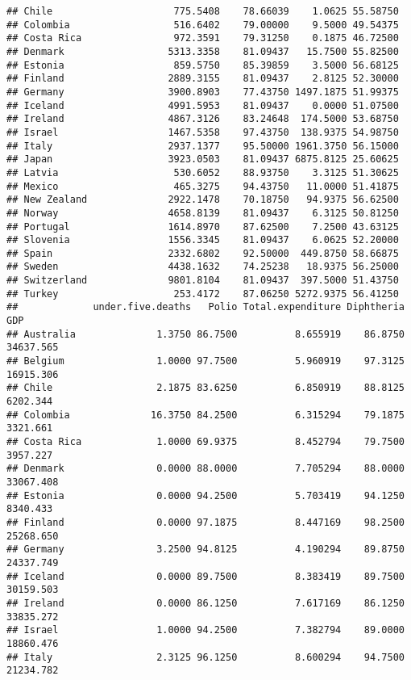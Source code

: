 \documentclass[
]{article}
\begin{document}
\begin{verbatim}
## Chile                     775.5408    78.66039    1.0625 55.58750
## Colombia                  516.6402    79.00000    9.5000 49.54375
## Costa Rica                972.3591    79.31250    0.1875 46.72500
## Denmark                  5313.3358    81.09437   15.7500 55.82500
## Estonia                   859.5750    85.39859    3.5000 56.68125
## Finland                  2889.3155    81.09437    2.8125 52.30000
## Germany                  3900.8903    77.43750 1497.1875 51.99375
## Iceland                  4991.5953    81.09437    0.0000 51.07500
## Ireland                  4867.3126    83.24648  174.5000 53.68750
## Israel                   1467.5358    97.43750  138.9375 54.98750
## Italy                    2937.1377    95.50000 1961.3750 56.15000
## Japan                    3923.0503    81.09437 6875.8125 25.60625
## Latvia                    530.6052    88.93750    3.3125 51.30625
## Mexico                    465.3275    94.43750   11.0000 51.41875
## New Zealand              2922.1478    70.18750   94.9375 56.62500
## Norway                   4658.8139    81.09437    6.3125 50.81250
## Portugal                 1614.8970    87.62500    7.2500 43.63125
## Slovenia                 1556.3345    81.09437    6.0625 52.20000
## Spain                    2332.6802    92.50000  449.8750 58.66875
## Sweden                   4438.1632    74.25238   18.9375 56.25000
## Switzerland              9801.8104    81.09437  397.5000 51.43750
## Turkey                    253.4172    87.06250 5272.9375 56.41250
##             under.five.deaths   Polio Total.expenditure Diphtheria       GDP
## Australia              1.3750 86.7500          8.655919    86.8750 34637.565
## Belgium                1.0000 97.7500          5.960919    97.3125 16915.306
## Chile                  2.1875 83.6250          6.850919    88.8125  6202.344
## Colombia              16.3750 84.2500          6.315294    79.1875  3321.661
## Costa Rica             1.0000 69.9375          8.452794    79.7500  3957.227
## Denmark                0.0000 88.0000          7.705294    88.0000 33067.408
## Estonia                0.0000 94.2500          5.703419    94.1250  8340.433
## Finland                0.0000 97.1875          8.447169    98.2500 25268.650
## Germany                3.2500 94.8125          4.190294    89.8750 24337.749
## Iceland                0.0000 89.7500          8.383419    89.7500 30159.503
## Ireland                0.0000 86.1250          7.617169    86.1250 33835.272
## Israel                 1.0000 94.2500          7.382794    89.0000 18860.476
## Italy                  2.3125 96.1250          8.600294    94.7500 21234.782

\end{verbatim}
\end{document}
